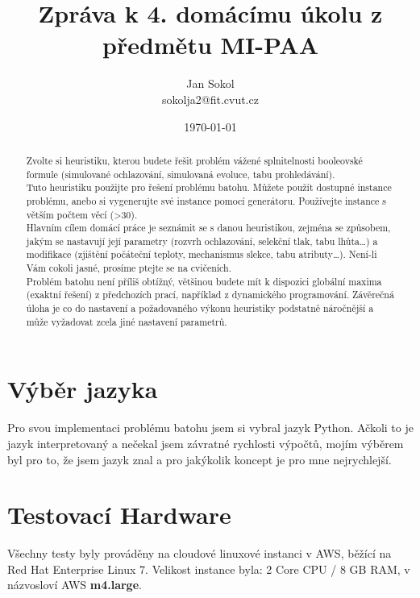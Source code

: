 \documentclass[a4paper,10pt,twocolumn]{article}
\title{Zpráva k 4. domácímu úkolu z předmětu MI-PAA}
\date{\today}
\author{Jan Sokol \\ sokolja2@fit.cvut.cz}
\begin{document}
\maketitle
\begin{abstract}

Zvolte si heuristiku, kterou budete řešit problém vážené splnitelnosti booleovské formule (simulované ochlazování, simulovaná evoluce, tabu prohledávání). \\
Tuto heuristiku použijte pro řešení problému batohu. Můžete použít dostupné instance problému, anebo si vygenerujte své instance pomocí generátoru. Používejte instance s větším počtem věcí (>30). \\
Hlavním cílem domácí práce je seznámit se s danou heuristikou, zejména se způsobem, jakým se nastavují její parametry (rozvrh ochlazování, selekční tlak, tabu lhůta…) a modifikace (zjištění počáteční teploty, mechanismus slekce, tabu atributy…). Není-li Vám cokoli jasné, prosíme ptejte se na cvičeních. \\
Problém batohu není příliš obtížný, většinou budete mít k dispozici globální maxima (exaktní řešení) z předchozích prací, například z dynamického programování. Závěrečná úloha je co do nastavení a požadovaného výkonu heuristiky podstatně náročnější a může vyžadovat zcela jiné nastavení parametrů.


\end{abstract}

\section{Výběr jazyka}
Pro svou implementaci problému batohu jsem si vybral jazyk Python. Ačkoli to je jazyk interpretovaný a nečekal jsem závratné rychlosti výpočtů, mojím výběrem byl pro to, že jsem jazyk znal a pro jakýkolik koncept je pro mne nejrychlejší.


\section{Testovací Hardware}
Všechny testy byly prováděny na cloudové linuxové instanci v AWS, běžící na Red Hat Enterprise Linux 7. Velikost instance byla:
  2 Core CPU / 8 GB RAM, v názvosloví AWS \textbf{m4.large}.
\end{document}
